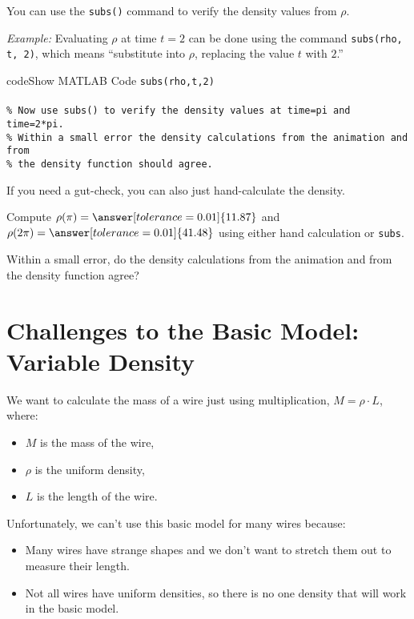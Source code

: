 \documentclass{ximera}
\begin{document}
You can use the \texttt{subs()} command to verify the density values from $\rho$. 

\begin{remark}
\textit{Example:} Evaluating $\rho$ at time $t=2$ can be done using the command \texttt{subs(rho, t, 2)}, which means ``substitute into $\rho$, replacing the value $t$ with $2$.''
\end{remark}

\begin{expandable}{code}{Show MATLAB Code}
\texttt{subs(rho,t,2)}\\
\\
\texttt{\% Now use subs() to verify the density values at time=pi and time=2*pi.}\\
\texttt{\% Within a small error the density calculations from the animation and from}\\
\texttt{\% the density function should agree.}
\end{expandable}

\begin{problem}
If you need a gut-check, you can also just hand-calculate the density.

Compute $\rho(\pi) = \answer[tolerance=0.01]{11.87}$ and $\rho(2\pi) = \answer[tolerance=0.01]{41.48}$ using either hand calculation or \texttt{subs}. 

Within a small error, do the density calculations from the animation and from the density function agree? 
\end{problem}

\section*{Challenges to the Basic Model: Variable Density}

We want to calculate the mass of a wire just using multiplication, $M = \rho \cdot L$, where:
\begin{itemize}
\item $M$ is the mass of the wire,
\item $\rho$ is the uniform density,
\item $L$ is the length of the wire.
\end{itemize}

Unfortunately, we can't use this basic model for many wires because:
\begin{itemize}
\item Many wires have strange shapes and we don't want to stretch them out to measure their length.
\item Not all wires have uniform densities, so there is no one density that will work in the basic model.
\end{itemize}
\end{document}
